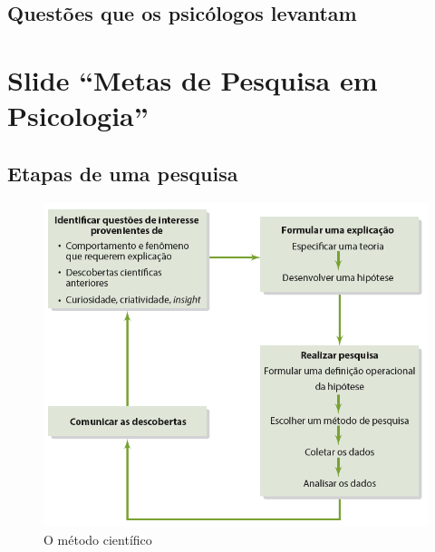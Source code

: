 \documentclass[
]{book}
\begin{document}
\hypertarget{questuxf5es-que-os-psicuxf3logos-levantam}{%
\subsection{Questões que os psicólogos levantam}\label{questuxf5es-que-os-psicuxf3logos-levantam}}

\hypertarget{slide-metas-de-pesquisa-em-psicologia}{%
\section{Slide ``Metas de Pesquisa em Psicologia''}\label{slide-metas-de-pesquisa-em-psicologia}}

\hypertarget{etapas-de-uma-pesquisa}{%
\subsection{Etapas de uma pesquisa}\label{etapas-de-uma-pesquisa}}

\begin{figure}

{\centering \includegraphics[width=0.8\linewidth]{imagens/o-metodo-cientifico} 

}

\caption{O método científico}\label{fig:unnamed-chunk-8}
\end{figure}
\end{document}

